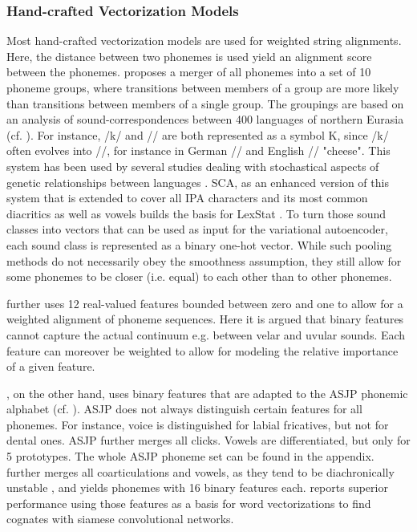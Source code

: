 \documentclass[6pt]{article}
\begin{document}
\subsubsection{Hand-crafted Vectorization Models}
\label{Hand-crafted Vectorization Models}
Most hand-crafted vectorization models are used for weighted string alignments. Here, the distance between two phonemes is used yield an alignment score between the phonemes. \cite{dolgopolsky1986probabilistic} proposes a merger of all phonemes into a set of 10 phoneme groups, where transitions between  members of a group are more likely than transitions between members of a single group. The groupings are based on an analysis of sound-correspondences between 400 languages of northern Eurasia (cf. \cite[p. 119]{list2012lexstat}). For instance, /k/ and // are both represented as a symbol K, since /k/ often evolves into //, for instance in German // and English // "cheese". This system has been used by several studies dealing with stochastical aspects of genetic relationships between languages \citep{baxter2000beyond,mortarino2009improved,turchin2010analyzing}. SCA, as an enhanced version of this system that is extended to cover all IPA characters and its most common diacritics as well as vowels builds the basis for LexStat \citep{list2012sca,list2012lexstat}. To turn those sound classes into vectors that can be used as input for the variational autoencoder, each sound class is represented as a binary one-hot vector. While such pooling methods do not necessarily obey the smoothness assumption, they still allow for some phonemes to be closer (i.e. equal) to each other than to other phonemes. 

 \cite{kondrak2000new} further uses 12 real-valued features bounded between zero and one to allow for a weighted alignment of phoneme sequences. Here it is argued that binary features cannot capture the actual continuum e.g. between velar and uvular sounds. Each feature can moreover be weighted to allow for modeling the relative importance of a given feature.


\cite{rama2016siamese}, on the other hand,  uses binary features that are adapted to the ASJP phonemic alphabet (cf. \cite{wichmann2010asjp}). ASJP does not always distinguish certain features for all phonemes. For instance, voice is distinguished for labial fricatives, but not for dental ones. ASJP further merges all clicks. Vowels are differentiated, but only for 5 prototypes. The whole ASJP phoneme set can be found in the appendix. \cite{rama2016siamese} further merges all coarticulations and vowels, as they tend to be diachronically unstable \citep{kessler2007word}, and yields phonemes with 16 binary features each. \cite{rama2016siamese} reports superior performance using those features as a basis for word vectorizations to find cognates with siamese convolutional networks.
\end{document}
